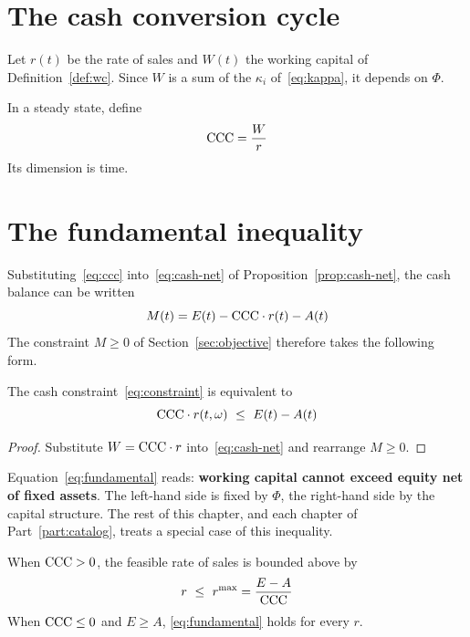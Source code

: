 \section{The cash conversion cycle}
\label{sec:ccc-def}

Let $r(t)$ be the rate of sales and $W(t)$ the working capital of Definition~\ref{def:wc}.
Since $W$ is a sum of the $\kappa_i$ of~\eqref{eq:kappa}, it depends on $\Phi$.

\begin{definition}
In a steady state, define
\begin{equation}
\mathrm{CCC} = \frac{W}{r}
\label{eq:ccc}
\end{equation}
Its dimension is time.
\end{definition}

\section{The fundamental inequality}
\label{sec:fundamental}

Substituting~\eqref{eq:ccc} into~\eqref{eq:cash-net} of Proposition~\ref{prop:cash-net},
the cash balance can be written
\begin{equation}
M(t) = E(t) - \mathrm{CCC}\cdot r(t) - A(t)
\label{eq:M-ccc}
\end{equation}
The constraint $M\geq 0$ of Section~\ref{sec:objective} therefore takes the following form.

\begin{proposition}
\label{prop:fundamental}
The cash constraint~\eqref{eq:constraint} is equivalent to
\begin{equation}
\mathrm{CCC}\cdot r(t,\omega) \ \leq\ E(t) - A(t)
\label{eq:fundamental}
\end{equation}
\end{proposition}

\begin{proof}
Substitute $W=\mathrm{CCC}\cdot r$ into~\eqref{eq:cash-net} and rearrange $M\geq 0$.
\end{proof}

Equation~\eqref{eq:fundamental} reads: \textbf{working capital cannot exceed equity net of
fixed assets}. The left-hand side is fixed by $\Phi$, the right-hand side by the capital
structure. The rest of this chapter, and each chapter of Part~\ref{part:catalog}, treats a
special case of this inequality.

\begin{corollary}
\label{cor:rmax}
When $\mathrm{CCC}>0$, the feasible rate of sales is bounded above by
\begin{equation}
r \ \leq\ r^{\max} = \frac{E-A}{\mathrm{CCC}}
\label{eq:rmax}
\end{equation}
When $\mathrm{CCC}\leq 0$ and $E\geq A$,
\eqref{eq:fundamental} holds for every $r$.
\end{corollary}

